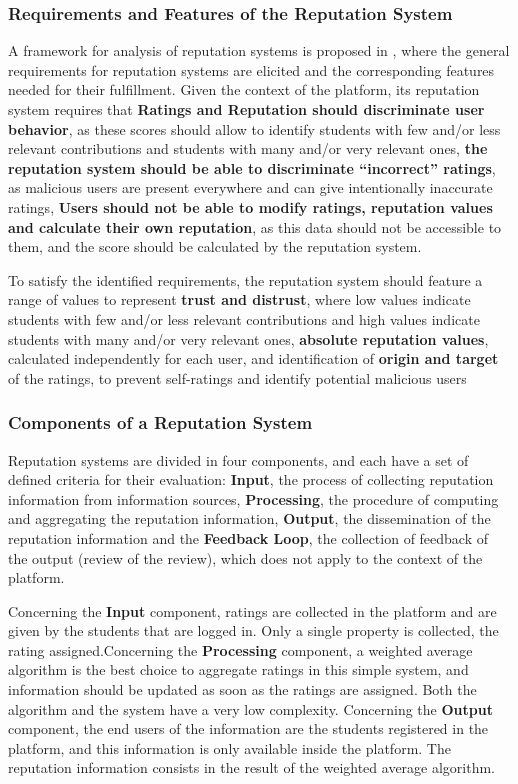\documentclass[conference]{IEEEtran}
\begin{document}
\subsubsection{Requirements and Features of the Reputation System}

A framework for analysis of reputation systems is proposed in \cite{vavilis2014reference}, where the general requirements for reputation systems are elicited and the corresponding features needed for their fulfillment. Given the context of the platform, its reputation system requires that \textbf{Ratings and Reputation should discriminate user behavior}, as these scores should allow to identify students with few and/or less relevant contributions and students with many and/or very relevant ones, \textbf{the reputation system should be able to discriminate ``incorrect'' ratings}, as malicious users are present everywhere and can give intentionally inaccurate ratings, \textbf{Users should not be able to modify ratings, reputation values and calculate their own reputation}, as this data should not be accessible to them, and the score should be calculated by the reputation system.

To satisfy the identified requirements, the reputation system should feature a range of values to represent \textbf{trust and distrust}, where low values indicate students with few and/or less relevant contributions and high values indicate students with many and/or very relevant ones, \textbf{absolute reputation values}, calculated independently for each user, and identification of \textbf{origin and target} of the ratings, to prevent self-ratings and identify potential malicious users

\subsubsection{Components of a Reputation System}
Reputation systems are divided in four components\cite{liu2012systematic,liu2010evaluation}, and each have a set of defined criteria for their evaluation: \textbf{Input}, the process of collecting reputation information from information sources, \textbf{Processing}, the procedure of computing and aggregating the reputation information, \textbf{Output}, the dissemination of the reputation information and the \textbf{Feedback Loop}, the collection of feedback of the output (review of the review), which does not apply to the context of the platform.

Concerning the \textbf{Input} component, ratings are collected in the platform and are given by the students that are logged in. Only a single property is collected, the rating assigned.Concerning the \textbf{Processing} component, a weighted average algorithm is the best choice to aggregate ratings in this simple system, and information should be updated as soon as the ratings are assigned. Both the algorithm and the system have a very low complexity. Concerning the \textbf{Output} component, the end users of the information are the students registered in the platform, and this information is only available inside the platform. The reputation information consists in the result of the weighted average algorithm.
\end{document}
